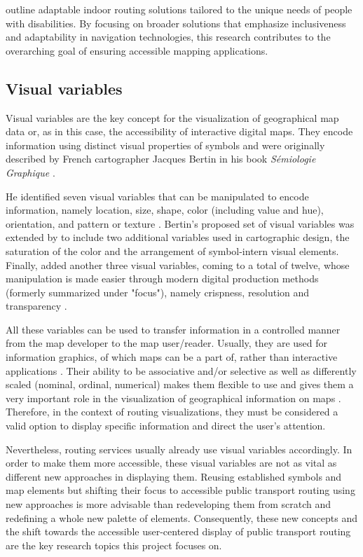 \documentclass[agile, final]{copernicus-agile}
\begin{document}
\cite{LudersEA2022} outline adaptable indoor routing solutions tailored to the unique needs of people with disabilities. By focusing on broader solutions that emphasize inclusiveness and adaptability in navigation technologies, this research contributes to the overarching goal of ensuring accessible mapping applications.
 
\subsection{Visual variables}

Visual variables are the key concept for the visualization of geographical map data or, as in this case, the accessibility of interactive digital maps. They encode information using distinct visual properties of symbols and were originally described by French cartographer Jacques Bertin in his book \textit{Sémiologie Graphique} \citeyear{Bertin1967}.

He identified seven visual variables that can be manipulated to encode information, namely location, size, shape, color (including value and hue), orientation, and pattern or texture \citep{Bertin1967}. Bertin’s proposed set of visual variables was extended by \citet{Morrison1974} to include two additional variables used in cartographic design, the saturation of the color and the arrangement of symbol-intern visual elements. Finally, \citet{MacEachren1995} added another three visual variables, coming to a total of twelve, whose manipulation is made easier through modern digital production methods (formerly summarized under "focus"), namely crispness, resolution and transparency \citep{Roth2017}.

All these variables can be used to transfer information in a controlled manner from the map developer to the map user/reader. Usually, they are used for information graphics, of which maps can be a part of, rather than interactive applications \citep{NeuschmidEA2012}. Their ability to be associative and/or selective as well as differently scaled (nominal, ordinal, numerical) makes them flexible to use and gives them a very important role in the visualization of geographical information on maps \citep{Roth2017}. Therefore, in the context of routing visualizations, they must be considered a valid option to display specific information and direct the user's attention.

Nevertheless, routing services usually already use visual variables accordingly. In order to make them more accessible, these visual variables are not as vital as different new approaches in displaying them. Reusing established symbols and map elements but shifting their focus to accessible public transport routing using new approaches is more advisable than redeveloping them from scratch and redefining a whole new palette of elements. Consequently, these new concepts and the shift towards the accessible user-centered display of public transport routing are the key research topics this project focuses on. 
\end{document}
